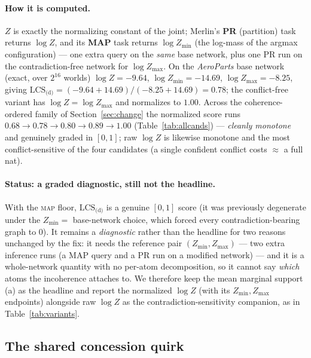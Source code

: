 \documentclass[11pt]{article}
\begin{document}
\paragraph{How it is computed.} $Z$ is exactly the normalizing constant of the joint;
Merlin's \textbf{PR} (partition) task returns $\log Z$, and its \textbf{MAP} task returns
$\log Z_{\min}$ (the log-mass of the argmax configuration) --- one extra query on the
\emph{same} base network, plus one PR run on the contradiction-free network for
$\log Z_{\max}$. On the \emph{AeroParts} base network (exact, over $2^{16}$ worlds)
$\log Z=-9.64$, $\log Z_{\min}=-14.69$, $\log Z_{\max}=-8.25$, giving
$\mathrm{LCS}_{\text{(d)}}=(-9.64+14.69)/(-8.25+14.69)=\mathbf{0.78}$; the conflict-free
variant has $\log Z=\log Z_{\max}$ and normalizes to $\mathbf{1.00}$. Across the
coherence-ordered family of Section~\ref{sec:change} the normalized score runs
$0.68\to0.78\to0.80\to0.89\to1.00$ (Table~\ref{tab:allcands}) --- \emph{cleanly monotone} and
genuinely graded in $[0,1]$; raw $\log Z$ is likewise monotone and the most
conflict-sensitive of the four candidates (a single confident conflict costs
$\approx$ a full nat).

\paragraph{Status: a graded diagnostic, still not the headline.} With the \textsc{map} floor,
$\mathrm{LCS}_{\text{(d)}}$ is a genuine $[0,1]$ score (it was previously degenerate under the
$Z_{\min}=$ base-network choice, which forced every contradiction-bearing graph to $0$). It
remains a \emph{diagnostic} rather than the headline for two reasons unchanged by the fix: it
needs the reference pair $(Z_{\min},Z_{\max})$ --- two extra inference runs (a MAP query and a
PR run on a modified network) --- and it is a whole-network quantity with no per-atom
decomposition, so it cannot say \emph{which} atoms the incoherence attaches to. We therefore
keep the mean marginal support (a) as the headline and report the normalized $\log Z$ (with
its $Z_{\min},Z_{\max}$ endpoints) alongside raw $\log Z$ as the contradiction-sensitivity
companion, as in Table~\ref{tab:variants}.

\subsection{The shared concession quirk}
\label{sec:quirk}
\end{document}
